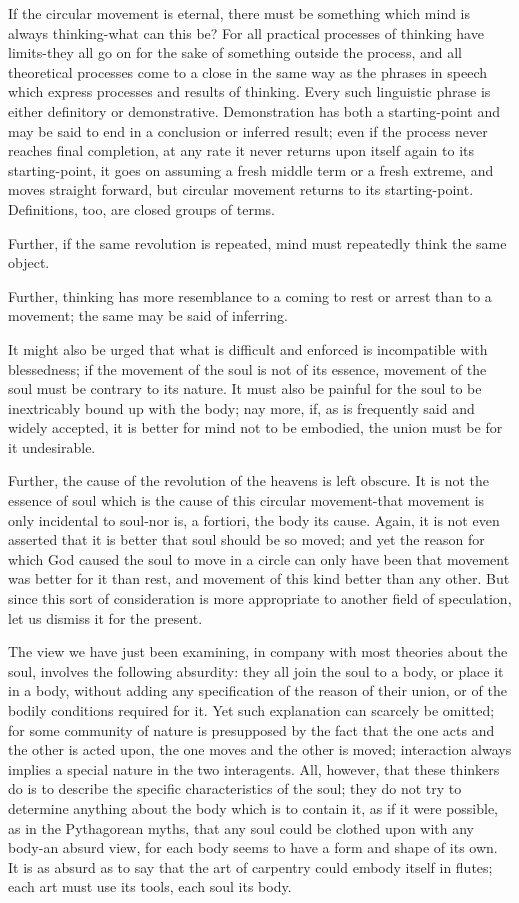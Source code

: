If the circular movement is eternal, there must be something which
mind is always thinking-what can this be? For all practical processes
of thinking have limits-they all go on for the sake of something outside
the process, and all theoretical processes come to a close in the
same way as the phrases in speech which express processes and results
of thinking. Every such linguistic phrase is either definitory or
demonstrative. Demonstration has both a starting-point and may be
said to end in a conclusion or inferred result; even if the process
never reaches final completion, at any rate it never returns upon
itself again to its starting-point, it goes on assuming a fresh middle
term or a fresh extreme, and moves straight forward, but circular
movement returns to its starting-point. Definitions, too, are closed
groups of terms. 

Further, if the same revolution is repeated, mind must repeatedly
think the same object. 

Further, thinking has more resemblance to a coming to rest or arrest
than to a movement; the same may be said of inferring. 

It might also be urged that what is difficult and enforced is incompatible
with blessedness; if the movement of the soul is not of its essence,
movement of the soul must be contrary to its nature. It must also
be painful for the soul to be inextricably bound up with the body;
nay more, if, as is frequently said and widely accepted, it is better
for mind not to be embodied, the union must be for it undesirable.

Further, the cause of the revolution of the heavens is left obscure.
It is not the essence of soul which is the cause of this circular
movement-that movement is only incidental to soul-nor is, a fortiori,
the body its cause. Again, it is not even asserted that it is better
that soul should be so moved; and yet the reason for which God caused
the soul to move in a circle can only have been that movement was
better for it than rest, and movement of this kind better than any
other. But since this sort of consideration is more appropriate to
another field of speculation, let us dismiss it for the present.

The view we have just been examining, in company with most theories
about the soul, involves the following absurdity: they all join the
soul to a body, or place it in a body, without adding any specification
of the reason of their union, or of the bodily conditions required
for it. Yet such explanation can scarcely be omitted; for some community
of nature is presupposed by the fact that the one acts and the other
is acted upon, the one moves and the other is moved; interaction always
implies a special nature in the two interagents. All, however, that
these thinkers do is to describe the specific characteristics of the
soul; they do not try to determine anything about the body which is
to contain it, as if it were possible, as in the Pythagorean myths,
that any soul could be clothed upon with any body-an absurd view,
for each body seems to have a form and shape of its own. It is as
absurd as to say that the art of carpentry could embody itself in
flutes; each art must use its tools, each soul its body.

